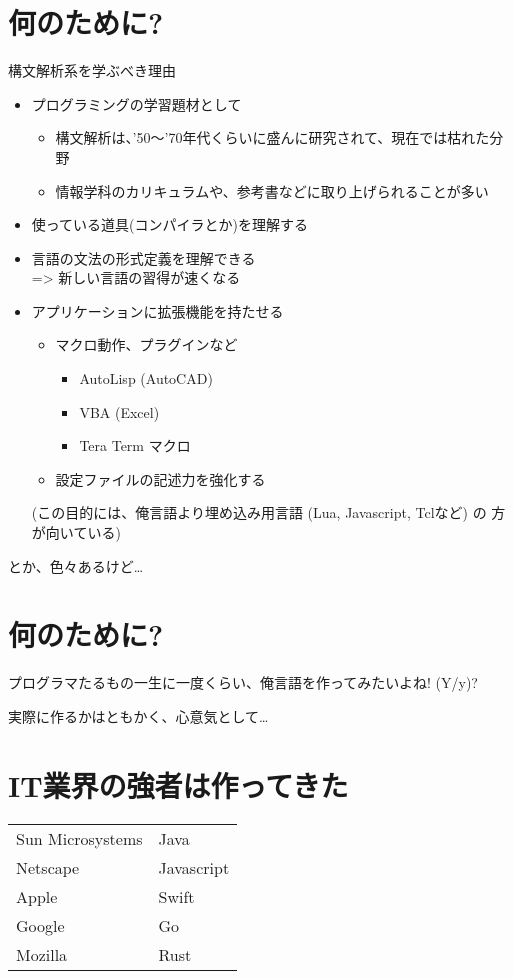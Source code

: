 \documentclass[slide,papersize,fleqn]{jsarticle}
\begin{document}
\section{何のために?}
\small
構文解析系を学ぶべき理由
\begin{itemize}
\item プログラミングの学習題材として
  \begin{itemize}
  \item 構文解析は、'50〜'70年代くらいに盛んに研究されて、現在では枯れた分野
  \item 情報学科のカリキュラムや、参考書などに取り上げられることが多い
  \end{itemize}
\item 使っている道具(コンパイラとか)を理解する 
\item 言語の文法の形式定義を理解できる \\
  => 新しい言語の習得が速くなる
\item アプリケーションに拡張機能を持たせる
  \begin{itemize}
  \item マクロ動作、プラグインなど \\
    \begin{itemize}
      \item AutoLisp (AutoCAD)
      \item VBA (Excel)
      \item Tera Term マクロ
    \end{itemize}
  \item 設定ファイルの記述力を強化する
  \end{itemize}
  {\tiny (この目的には、俺言語より埋め込み用言語 (Lua, Javascript, Tclなど) の
  方が向いている)}
\end{itemize}
とか、色々あるけど…
\section{何のために?}
\begin{tcolorbox}
  \Large
  プログラマたるもの一生に一度くらい、俺言語を作ってみたいよね! (Y/y)?
\end{tcolorbox}
\begin{flushright}
実際に作るかはともかく、心意気として…
\end{flushright}
\section{IT業界の強者は作ってきた}
\begin{tabular}{ll}
  Sun Microsystems & Java \\
  Netscape & Javascript \\
  Apple & Swift \\
  Google & Go \\
  Mozilla & Rust
\end{tabular}
\end{document}
